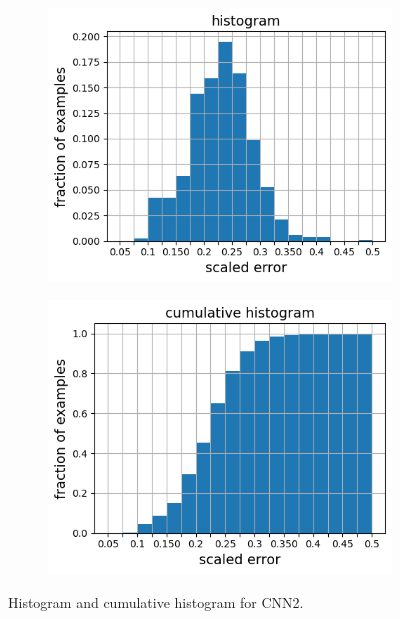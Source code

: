 \documentclass[12pt]{article}
\newcommand{\nhghalfwidth}{0.48\linewidth}
\newcommand{\nhgtotalheight}{4cm}
\begin{document}
\begin{figure}[!h]
\captionsetup[subfigure]{justification=centering}
  \centering
  \begin{subfigure}[c]{\nhghalfwidth}
    \centering
    \includegraphics[totalheight=\nhgtotalheight]{Figures/Results2/histogram.png}
  \end{subfigure}
%  
  \begin{subfigure}[c]{\nhghalfwidth}
    \centering
    \includegraphics[totalheight=\nhgtotalheight]{Figures/Results2/cumulative.png}
  \end{subfigure}
  \caption{\label{fig:cnn2histo} Histogram and cumulative histogram for CNN2.}
\end{figure}
%
\end{document}
